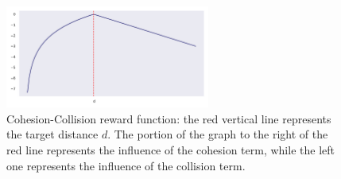 \documentclass[12pt,a4paper,openright,twoside]{book}
\begin{document}
    \begin{figure}[t]
        \centering
        \includegraphics[width=0.6\textwidth]{figures/ccreward.pdf}
        \caption{Cohesion-Collision reward function: the red vertical line represents the target distance $d$.
            The portion of the graph to the right of the red line represents the influence of the cohesion term,
            while the left one represents the influence of the collision term.
        }
        \label{fig:cc-rf}
    \end{figure}
\end{document}
